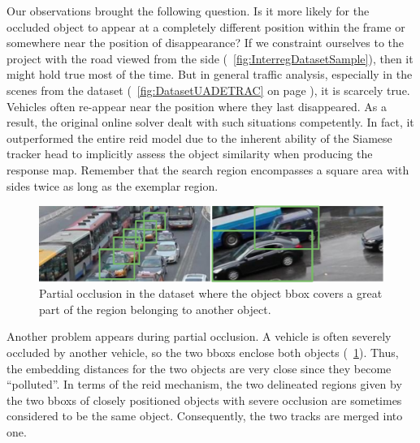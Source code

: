 Our observations brought the following question. Is it more likely for the occluded object to appear at a completely different position within the frame or somewhere near the position of disappearance? If we constraint ourselves to the \interreg{} project with the road viewed from the side (\figtext{}~\ref{fig:InterregDatasetSample}), then it might hold true most of the time. But in general traffic analysis, especially in the scenes from the \uadetrac{} dataset (\figtext{}~\ref{fig:DatasetUADETRAC} on page \pageref{fig:DatasetUADETRAC}), it is scarcely true. Vehicles often re-appear near the position where they last disappeared. As a result, the original online solver dealt with such situations competently. In fact, it outperformed the entire \gls{reid} model due to the inherent ability of the Siamese tracker head to implicitly assess the object similarity when producing the response map. Remember that the search region encompasses a square area with sides twice as long as the exemplar region.

\begin{figure}[!t]
    \centering
    \includegraphics[width=\linewidth]{figures/siamese_tracking/uadetrac_partial_occlusion_multiple_cars.pdf}
    \caption[Partial occlusion in \uadetrac{} dataset]{Partial occlusion in the \uadetrac{} dataset where the object \gls{bbox} covers a great part of the region belonging to another object.}
    \label{fig:UADETRACPartialOcclusionMultiple}
\end{figure}

Another problem appears during partial occlusion. A vehicle is often severely occluded by another vehicle, so the two \glspl{bbox} enclose both objects (\figtext{}~\ref{fig:UADETRACPartialOcclusionMultiple}). Thus, the embedding distances for the two objects are very close since they become ``polluted''. In terms of the \gls{reid} mechanism, the two delineated regions given by the two \glspl{bbox} of closely positioned objects with severe occlusion are sometimes considered to be the same object. Consequently, the two tracks are merged into one.


